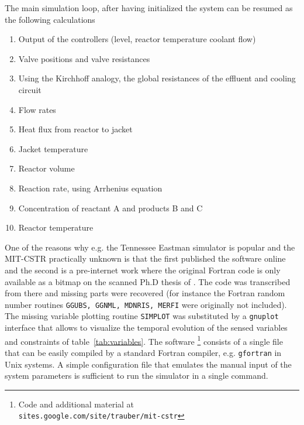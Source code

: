 \documentclass[10pt, conference, compsocconf]{IEEEtran}
\newcommand{\reftab}[1]{table~\ref{tab:#1}}
\begin{document}
The main simulation loop, after having initialized the system
can be resumed as the following calculations
\begin{enumerate}
\item Output of the controllers
(level, reactor temperature coolant flow)
\item Valve positions and valve resistances
\item Using the Kirchhoff analogy, the global resistances of the
effluent and cooling circuit
\item Flow rates
\item Heat flux from reactor to jacket
\item Jacket temperature
\item Reactor volume
\item Reaction rate, using Arrhenius equation
\item Concentration of reactant A and products B and C
\item Reactor temperature
\end{enumerate}

One of the reasons why e.g. the Tennessee Eastman simulator
is popular and the MIT-CSTR practically unknown is that the
first published the software online and the second is a
pre-internet work where the original Fortran code
is only available as a bitmap on the scanned Ph.D thesis
of \cite{phdthesisFinch1989}.
The code was transcribed from there and missing parts
were recovered (for instance the Fortran random number routines 
\texttt{GGUBS, GGNML, MDNRIS, MERFI} were originally not included).
The missing variable plotting routine \texttt{SIMPLOT}
was substituted by a \texttt{gnuplot} interface that
allows to visualize the temporal evolution of the
sensed variables and constraints of \reftab{variables}.
The software \footnote{Code and additional material at\\
\texttt{sites.google.com/site/trauber/mit-cstr}}
consists of a single file that can be easily compiled
by a standard Fortran compiler, e.g. \texttt{gfortran}
in Unix systems. A simple configuration file that emulates
the manual input of the system parameters is sufficient
to run the simulator in a single command.





\end{document}
